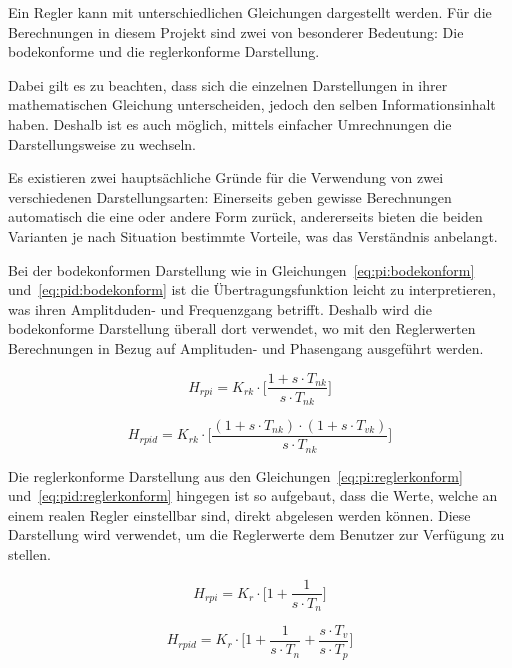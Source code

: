 Ein Regler  kann mit unterschiedlichen Gleichungen  dargestellt werden.  F\"ur
die Berechnungen  in diesem  Projekt sind  zwei von  besonderer Bedeutung: Die
bodekonforme und die reglerkonforme Darstellung.

Dabei gilt  es zu  beachten, dass  sich die  einzelnen Darstellungen  in ihrer
mathematischen Gleichung  unterscheiden, jedoch den  selben Informationsinhalt
haben. Deshalb   ist  es   auch  m\"oglich,  mittels  einfacher   Umrechnungen
die  Darstellungsweise   zu  wechseln.

Es  existieren  zwei  haupts\"achliche   Gr\"unde  f\"ur  die  Verwendung  von
zwei  verschiedenen Darstellungsarten: Einerseits  geben gewisse  Berechnungen
automatisch  die  eine oder  andere  Form  zur\"uck, andererseits  bieten  die
beiden Varianten je  nach Situation bestimmte Vorteile,  was das Verst\"andnis
anbelangt.

Bei der  bodekonformen Darstellung wie  in Gleichungen~\ref{eq:pi:bodekonform}
und~\ref{eq:pid:bodekonform}   ist   die  \"Ubertragungsfunktion   leicht   zu
interpretieren,  was ihren  Amplitduden- und  Frequenzgang betrifft.   Deshalb
wird  die  bodekonforme  Darstellung  \"uberall dort  verwendet,  wo  mit  den
Reglerwerten Berechnungen in Bezug auf Amplituden- und Phasengang ausgef\"uhrt
werden.

\begin{equation} \label{eq:pi:bodekonform}
    H_{rpi} = K_{rk} \cdot \biggl[ \frac{1 + s \cdot T_{nk}}{s \cdot T_{nk}} \biggr]
\end{equation}

\begin{equation} \label{eq:pid:bodekonform}
    H_{rpid} = K_{rk} \cdot \biggl[ \frac{(1 + s \cdot T_{nk}) \cdot (1 + s \cdot T_{vk}) }{ s \cdot T_{nk} } \biggr]
\end{equation}


Die reglerkonforme  Darstellung aus  den Gleichungen~\ref{eq:pi:reglerkonform}
und~\ref{eq:pid:reglerkonform}  hingegen ist  so  aufgebaut,  dass die  Werte,
welche  an  einem realen  Regler  einstellbar  sind, direkt  abgelesen  werden
k\"onnen. Diese Darstellung  wird verwendet,  um die Reglerwerte  dem Benutzer
zur Verf\"ugung zu stellen.

\begin{equation} \label{eq:pi:reglerkonform}
    H_{rpi} = K_{r} \cdot \biggl[ 1 + \frac{1}{s \cdot T_{n}} \biggr]
\end{equation}

\begin{equation} \label{eq:pid:reglerkonform}
    H_{rpid} = K_{r} \cdot \biggl[ 1 + \frac{1}{s \cdot T_n} + \frac{s \cdot T_v}{s \cdot T_p} \biggr]
\end{equation}

